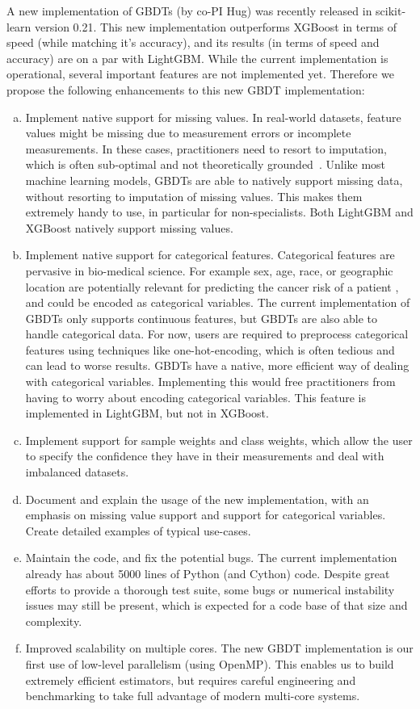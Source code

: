 \documentclass[11pt]{article}  %
\begin{document}
A new implementation of GBDTs (by co-PI Hug) was recently
released in scikit-learn version 0.21. This new implementation
outperforms XGBoost in terms of speed (while matching it's accuracy), and its results (in terms of speed and accuracy)
are on a par with LightGBM. While the current implementation is operational,
several important features are not implemented yet. Therefore we propose the following enhancements to this new GBDT implementation:
\begin{enumerate}[a)]
\item Implement native support for missing values. In real-world datasets, feature values might be missing due to measurement errors or incomplete measurements. In these cases, practitioners need to resort to
imputation, which is often sub-optimal and not theoretically grounded~\cite{missing_values_consistency}.
Unlike most machine learning models, GBDTs are able to natively support
missing data, without resorting to imputation of missing values. This makes
them extremely handy to use, in particular for non-specialists. Both
LightGBM and XGBoost natively support missing values.
\item Implement native support for categorical features. Categorical
features are pervasive in bio-medical science. For example sex, age, race,
or geographic location are potentially relevant
for predicting the cancer risk of a patient \cite{RICHTER201929}, and could be encoded as categorical variables. The current
implementation of GBDTs only supports continuous features, but GBDTs are
also able to handle categorical data. For now, users are required to
preprocess categorical features using techniques like one-hot-encoding, which
is often tedious and can lead to worse results. GBDTs have a native, more efficient way of dealing with categorical variables. 
Implementing this would free practitioners from having to worry about encoding categorical variables.
This feature is implemented in LightGBM, but not in XGBoost.
\item Implement support for sample weights and class weights, which allow the user to specify the confidence they have in their measurements and deal with imbalanced datasets.
\item Document and explain the usage of the new implementation, with an emphasis on missing value support and support for categorical variables. Create detailed examples of typical use-cases.
\item Maintain the code, and fix the potential bugs. The current
implementation already has about 5000 lines of Python (and Cython) code.
Despite great efforts to provide a thorough test suite, some bugs or
numerical instability issues may still be present, which is expected for a
code base of that size and complexity.

\item Improved scalability on multiple cores. The new GBDT implementation is our first use of low-level
parallelism (using OpenMP). This enables us to build extremely
efficient estimators, but requires careful engineering and benchmarking to take full advantage of modern multi-core systems.
\end{enumerate}
\end{document}
